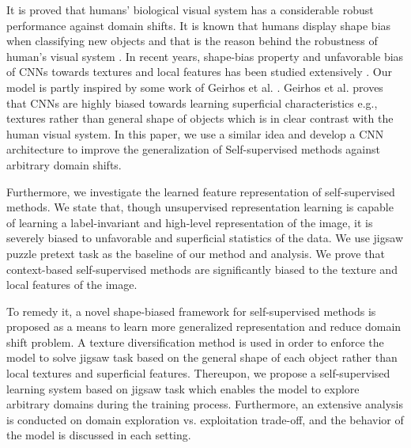 \documentclass[10pt,twocolumn,letterpaper]{article}
\begin{document}
It is proved that humans' biological visual system has a considerable robust performance against domain shifts. It is known that humans display shape bias when classifying new objects and that is the reason behind the robustness of human's visual system \cite{ritter2017cognitive, geirhos2018generalisation}.
In recent years, shape-bias property and unfavorable bias of CNNs towards textures and local features has been studied extensively \cite{hosseini2018assessing, geirhos2018imagenet, brendel2019approximating}.
Our model is partly inspired by some work of Geirhos et al. \cite{geirhos2018imagenet}. Geirhos et al. \cite{geirhos2018imagenet} proves that CNNs are highly biased towards learning superficial characteristics e.g., textures rather than general shape of objects which is in clear contrast with the human visual system.
In this paper, we use a similar idea and develop a CNN architecture to improve the generalization of Self-supervised methods against arbitrary domain shifts. 


Furthermore, we investigate the learned feature representation of self-supervised methods. We state that, though unsupervised representation learning is capable of learning a label-invariant and high-level representation of the image, it is severely biased to unfavorable and superficial statistics of the data. We use jigsaw puzzle \cite{noroozi2016unsupervised} pretext task as the baseline of our method and analysis. We prove that context-based self-supervised methods are significantly biased to the texture and local features of the image.

To remedy it, a novel shape-biased framework for self-supervised methods is proposed as a means to learn more generalized representation and reduce domain shift problem. A texture diversification method is used in order to enforce the model to solve jigsaw task based on the general shape of each object rather than local textures and superficial features. Thereupon, we propose a self-supervised learning system based on jigsaw task which enables the model to explore arbitrary domains during the training process.
Furthermore, an extensive analysis is conducted on domain exploration vs. exploitation trade-off, and the behavior of the model is discussed in each setting. 
\end{document}
